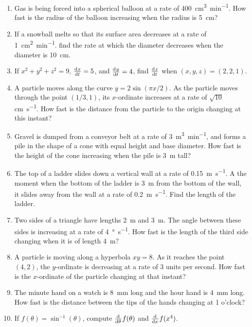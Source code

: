 \begin{enumerate}
        area of the square increasing when the area of the square is \SI{16}{\centi\metre\squared}?
  \item Gas is being forced into a spherical balloon at a rate of \SI{400}{\centi\metre\cubed\per\minute}. How fast
        is the radius of the balloon increasing when the radius is \SI{5}{\centi\metre}?
  \item If a snowball melts so that its surface area decreases at a rate of \SI{1}{\centi\metre\squared\per\minute}.
        find the rate at which the diameter decreases when the diameter is \SI{10}{\centi\metre}.
  \item If $ x^2 + y^2 + z^2 = 9 $, $ \od{x}{t} = 5 $, and $ \od{y}{t} = 4 $, find $ \od{z}{t} $ when $ (x,y,z) = (2,2,1) $.
  \item A particle moves along the curve $ y = 2\sin(\pi x/2) $. As the particle moves through the point $ (1/3, 1) $,
        its $ x$-ordinate increases at a rate of $ \sqrt{10} $ \si{\centi\metre\per\second}. How fast is the distance
        from the particle to the origin changing at this instant?
  \item Gravel is dumped from a conveyor belt at a rate of \SI{3}{\metre\cubed\per\minute}, and forms a pile in the shape
        of a cone with equal height and base diameter. How fast is the height of the cone increasing when the pile is \SI{3}{\metre}
        tall?
  \item The top of a ladder slides down a vertical wall at a rate of \SI{0.15}{\metre\per\second}. A the moment when the bottom
        of the ladder is \SI{3}{\metre} from the bottom of the wall, it slides away from the wall at a rate of \SI{0.2}{\metre\per\second}.
        Find the length of the ladder.
  \item Two sides of a triangle have lengths \SI{2}{\metre} and \SI{3}{\metre}. The angle between these sides is increasing
        at a rate of \SI{4}{\degree\per\second}. How fast is the length of the third side changing when it is of length \SI{4}{\metre}?
  \item A particle is moving along a hyperbola $ xy = 8 $. As it reaches the point $ (4, 2) $, the $ y$-ordinate is decreasing
        at a rate of 3 units per second. How fast is the $ x$-ordinate of the particle changing at that instant?
  \item The minute hand on a watch is \SI{8}{\milli\metre} long and the hour hand is \SI{4}{\milli\metre} long. How fast is the
        distance between the tips of the hands changing at 1 o'clock?
  \item If $ f(\theta) = \sin^{-1} (\theta) $, compute $ \od{}{\theta} f(\theta) $ and $ \od{}{x} f(x^4) $.

\end{enumerate}
